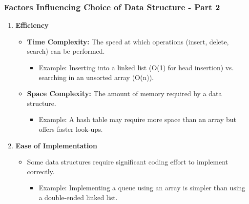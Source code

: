 \documentclass{beamer}
\begin{document}
\begin{frame}[fragile]
    \frametitle{Factors Influencing Choice of Data Structure - Part 2}
    \begin{enumerate}
        \item \textbf{Efficiency}
            \begin{itemize}
                \item \textbf{Time Complexity:} The speed at which operations (insert, delete, search) can be performed.
                \begin{itemize}
                    \item Example: Inserting into a linked list (O(1) for head insertion) vs. searching in an unsorted array (O(n)).
                \end{itemize}
                \item \textbf{Space Complexity:} The amount of memory required by a data structure.
                \begin{itemize}
                    \item Example: A hash table may require more space than an array but offers faster look-ups.
                \end{itemize}
            \end{itemize}
        \item \textbf{Ease of Implementation}
            \begin{itemize}
                \item Some data structures require significant coding effort to implement correctly.
                \begin{itemize}
                    \item Example: Implementing a queue using an array is simpler than using a double-ended linked list.
                \end{itemize}
            \end{itemize}
    \end{enumerate}
\end{frame}
\end{document}
